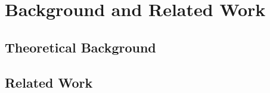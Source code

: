 \chapter{Background and Related Work}
\label{ch:background}


\section{Theoretical Background}

\section{Related Work}
